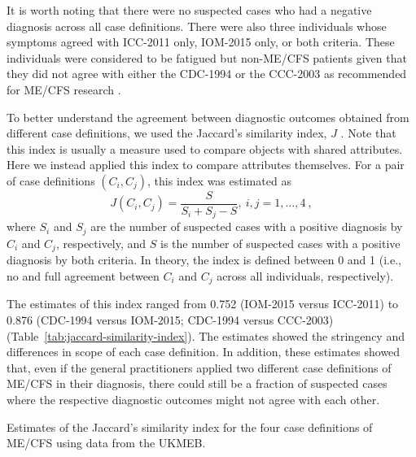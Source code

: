 It is worth noting that there were no suspected cases who had a negative diagnosis across all case definitions. There were also three individuals whose symptoms agreed with ICC-2011 only, IOM-2015 only, or both criteria. These individuals were considered to be fatigued but non-ME/CFS patients given that they did not agree with either the CDC-1994 or the CCC-2003 as  recommended for ME/CFS research \citep{pheby2020DevelopmentConsistent}.

To better understand the agreement between diagnostic outcomes obtained from different case definitions, we used the Jaccard's similarity index, $J$ \citep{gowerSimilarityDissimilarityDistance2014}. Note that this index is usually a measure used to compare objects with shared attributes. Here we instead applied this index to compare attributes themselves. For a pair of case definitions $(C_i, C_j)$, this index was estimated as
% 
\begin{equation}
    J(C_i, C_j) = \frac{S}{S_i + S_j - S}, \	i, j = 1, \dotsc, 4 \	,
    \label{eq:jaccard-index}
\end{equation}
% 
where $S_i$ and $S_j$ are the number of suspected cases with a positive diagnosis by $C_i$ and $C_j$, respectively, and $S$ is the number of suspected cases with a positive diagnosis by both criteria. In theory, the index is defined between 0 and 1 (i.e., no and full agreement between $C_i$ and $C_j$ across all individuals, respectively). 

The estimates of this index ranged from 0.752 (IOM-2015 versus ICC-2011) to 0.876 (CDC-1994 versus IOM-2015; CDC-1994 versus CCC-2003) (Table~\ref{tab:jaccard-similarity-index}). The estimates showed the stringency and differences in scope of each case definition. In addition, these estimates showed that, even if the general practitioners applied two different case definitions of ME/CFS in their diagnosis, there could still be a fraction of suspected cases where the respective diagnostic outcomes might not agree with each other. 

\begin{table}[h!]
    \centering
    \caption[Estimates of the Jaccard's similarity index for the four case definitions of ME/CFS]{Estimates of the Jaccard's similarity index for the four case definitions of ME/CFS using data from the UKMEB.}
    
    \label{tab:jaccard-similarity-index}
\end{table}

